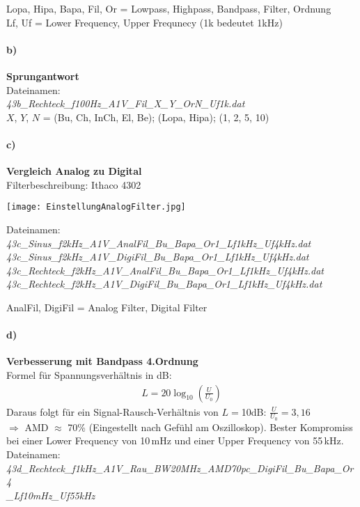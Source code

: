 Lopa, Hipa, Bapa, Fil, Or = Lowpass, Highpass, Bandpass, Filter, Ordnung\\
Lf, Uf = Lower Frequency, Upper Frequnecy (1k bedeutet 1kHz)

\paragraph{b)}\textbf{Sprungantwort}\\
Dateinamen:\\
\textit{43b\_Rechteck\_f100Hz\_A1V\_Fil\_X\_Y\_OrN\_Uf1k.dat}\\
$X$, $Y$, $N$ = (Bu, Ch, InCh, El, Be); (Lopa, Hipa); (1, 2, 5, 10)
\newpage
\paragraph{c)}\textbf{Vergleich Analog zu Digital}\\
Filterbeschreibung: Ithaco 4302
\begin{center}
    \texttt{[image: EinstellungAnalogFilter.jpg]}
    \label{image:analogFilter}
\end{center}
Dateinamen:\\
\textit{43c\_Sinus\_f2kHz\_A1V\_AnalFil\_Bu\_Bapa\_Or1\_Lf1kHz\_Uf4kHz.dat}\\
\textit{43c\_Sinus\_f2kHz\_A1V\_DigiFil\_Bu\_Bapa\_Or1\_Lf1kHz\_Uf4kHz.dat}\\
\textit{43c\_Rechteck\_f2kHz\_A1V\_AnalFil\_Bu\_Bapa\_Or1\_Lf1kHz\_Uf4kHz.dat}\\
\textit{43c\_Rechteck\_f2kHz\_A1V\_DigiFil\_Bu\_Bapa\_Or1\_Lf1kHz\_Uf4kHz.dat}

AnalFil, DigiFil = Analog Filter, Digital Filter

\paragraph{d)}\textbf{Verbesserung mit Bandpass 4.Ordnung}\\
Formel für Spannungsverhältnis in dB:
\begin{gather}
    L = 20 \log_{10}\left(\frac{U}{U_0}\right)
\end{gather}
Daraus folgt für ein Signal-Rausch-Verhältnis von $L=$10dB: $\frac{U}{U_0} = 3,16$\\
$\Rightarrow$ AMD $\approx$ 70\% (Eingestellt nach Gefühl am Oszilloskop). Bester Kompromiss bei einer Lower Frequency von 10\,mHz und einer Upper Frequency von 55\,kHz.\\
Dateinamen:\\
\textit{43d\_Rechteck\_f1kHz\_A1V\_Rau\_BW20MHz\_AMD70pc\_DigiFil\_Bu\_Bapa\_Or4\\
\_Lf10mHz\_Uf55kHz}
\newpage
